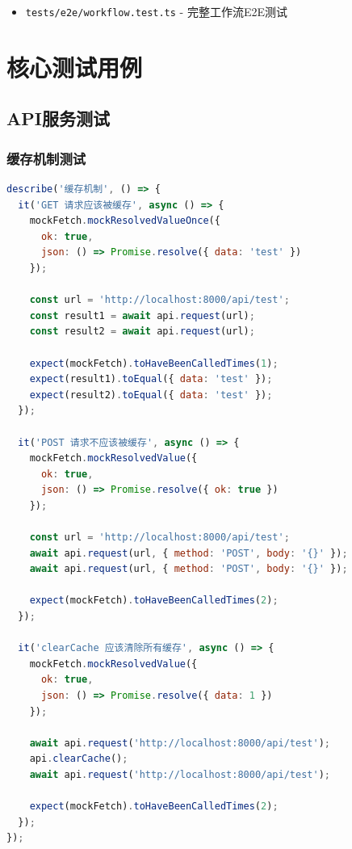 \documentclass[12pt,a4paper,openany]{report}
\begin{document}
\begin{itemize}
    \item \texttt{tests/e2e/workflow.test.ts} - 完整工作流E2E测试
\end{itemize}

\section{核心测试用例}

\subsection{API服务测试}

\subsubsection{缓存机制测试}

\begin{lstlisting}[language=JavaScript, caption=缓存机制测试用例]
describe('缓存机制', () => {
  it('GET 请求应该被缓存', async () => {
    mockFetch.mockResolvedValueOnce({
      ok: true,
      json: () => Promise.resolve({ data: 'test' })
    });

    const url = 'http://localhost:8000/api/test';
    const result1 = await api.request(url);
    const result2 = await api.request(url);

    expect(mockFetch).toHaveBeenCalledTimes(1);
    expect(result1).toEqual({ data: 'test' });
    expect(result2).toEqual({ data: 'test' });
  });

  it('POST 请求不应该被缓存', async () => {
    mockFetch.mockResolvedValue({
      ok: true,
      json: () => Promise.resolve({ ok: true })
    });

    const url = 'http://localhost:8000/api/test';
    await api.request(url, { method: 'POST', body: '{}' });
    await api.request(url, { method: 'POST', body: '{}' });

    expect(mockFetch).toHaveBeenCalledTimes(2);
  });

  it('clearCache 应该清除所有缓存', async () => {
    mockFetch.mockResolvedValue({
      ok: true,
      json: () => Promise.resolve({ data: 1 })
    });

    await api.request('http://localhost:8000/api/test');
    api.clearCache();
    await api.request('http://localhost:8000/api/test');

    expect(mockFetch).toHaveBeenCalledTimes(2);
  });
});
\end{lstlisting}
\end{document}
